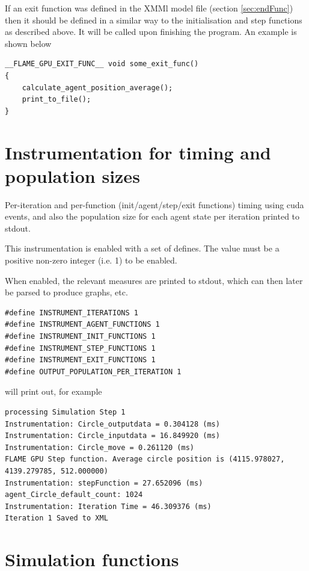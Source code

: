 \documentclass[11pt, a4paper, onecolumn, oneside]{report}
\begin{document}
If an exit function was defined in the XMMl model file (section \ref{sec:endFunc}) then it should be defined in a similar way to the initialisation and step functions as described above. It will be called upon finishing the program. An example is shown below

\begin{verbatim}
__FLAME_GPU_EXIT_FUNC__ void some_exit_func()
{
    calculate_agent_position_average();
    print_to_file();
}
\end{verbatim}

\section{Instrumentation for timing and population sizes}
\label{sec:TimingAndPop}

Per-iteration and per-function (init/agent/step/exit functions) timing using cuda events, and also the population size for each agent state per iteration printed to stdout.

This instrumentation is enabled with a set of defines. The value must be a positive non-zero integer (i.e. 1) to be enabled.

When enabled, the relevant measures are printed to stdout, which can then later be parsed to produce graphs, etc.

\begin{verbatim}
#define INSTRUMENT_ITERATIONS 1
#define INSTRUMENT_AGENT_FUNCTIONS 1
#define INSTRUMENT_INIT_FUNCTIONS 1
#define INSTRUMENT_STEP_FUNCTIONS 1
#define INSTRUMENT_EXIT_FUNCTIONS 1
#define OUTPUT_POPULATION_PER_ITERATION 1
\end{verbatim}

will print out, for example
\begin{verbatim}
processing Simulation Step 1
Instrumentation: Circle_outputdata = 0.304128 (ms)
Instrumentation: Circle_inputdata = 16.849920 (ms)
Instrumentation: Circle_move = 0.261120 (ms)
FLAME GPU Step function. Average circle position is (4115.978027, 4139.279785, 512.000000)
Instrumentation: stepFunction = 27.652096 (ms)
agent_Circle_default_count: 1024
Instrumentation: Iteration Time = 46.309376 (ms)
Iteration 1 Saved to XML
\end{verbatim}

\section{Simulation functions}
\end{document}
